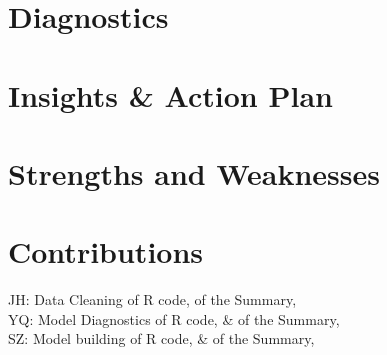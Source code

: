 \documentclass[12pt]{article}
\begin{document}
\section{Diagnostics}
\label{sec:diag}

\section{Insights \& Action Plan}
\label{sec:ins}

\section{Strengths and Weaknesses}
\label{sec:str}


\pagebreak
\section{Contributions}
\label{sec:con}
\noindent JH: Data Cleaning of R code,  of the Summary, \\
YQ: Model Diagnostics of R code,  \& of the Summary, \\
SZ: Model building of R code, \&  of the Summary, \\





\end{document}

